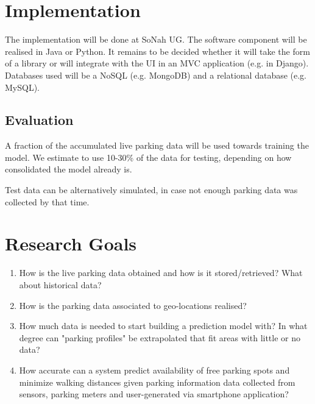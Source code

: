 \documentclass{article}
\begin{document}
 
\section{Implementation}
The implementation will be done at SoNah UG. The software component will be realised in Java or Python. It remains to be decided whether it will take the form of a library or will integrate with the UI in an MVC application (e.g. in Django). Databases used will be a NoSQL (e.g. MongoDB) and a relational database (e.g. MySQL).

\subsection{Evaluation}
A fraction of the accumulated live parking data will be used towards training the model. We estimate to use  10-30\% of the data for testing, depending on how consolidated the model already is.

\vspace{2mm}
Test data can be alternatively simulated, in case not enough parking data was collected by that time.

\section{Research Goals}
\begin{enumerate}
\item How is the live parking data obtained and how is it stored/retrieved? What about historical data?
\item How is the parking data associated to geo-locations realised?
\item How much data is needed to start building a prediction model with? In what degree can "parking profiles" be extrapolated that fit areas with little or no data?
\item How accurate can a system predict availability of free parking spots and minimize walking distances given parking information data collected from sensors, parking meters and user-generated via smartphone application?
\end{enumerate}
\end{document}
